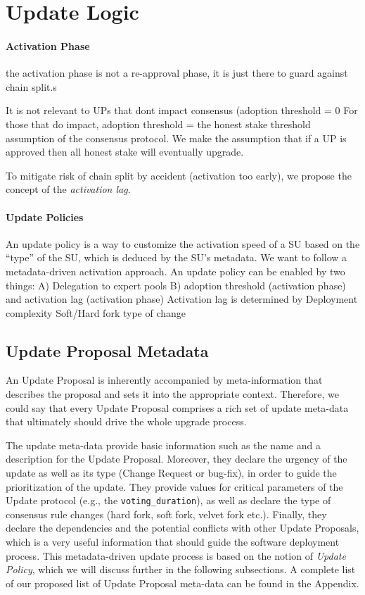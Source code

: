 \section{Update Logic}
\paragraph{Activation Phase} 
the activation phase is not a re-approval phase, it is just there to guard against chain split.s


It is not relevant to UPs that dont impact consensus (adoption threshold = 0%
For those that do impact, adoption threshold = the honest stake threshold assumption of the consensus protocol. We make the assumption that if a UP is approved then all honest stake will eventually upgrade.


To mitigate risk of chain split by accident (activation too early), we propose the concept of the \emph{activation lag}.


\paragraph{Update Policies} 
An update policy is a way to customize the activation speed of a SU based on the “type” of the SU, which is deduced by the SU’s metadata. We want to follow a metadata-driven activation approach. 
An update policy can be enabled by two things:
A) Delegation to expert pools
B) adoption threshold (activation phase) and activation lag (activation phase)
Activation lag is determined by
Deployment complexity
Soft/Hard fork type of change


\subsection*{Update Proposal Metadata} 
An Update Proposal is inherently accompanied by meta-information that describes the proposal and sets it into the appropriate context. Therefore, we could say that every Update Proposal comprises a rich set of update meta-data that ultimately should drive the whole upgrade process.

The update meta-data provide basic information such as the name and a description for the Update Proposal. Moreover, they declare the urgency of the update as well as its type (Change Request or bug-fix), in order to guide the prioritization of the update. They provide values for critical parameters of the Update protocol (e.g., the \verb;voting_duration;), as well as declare the type of consensus rule changes (hard fork, soft fork, velvet fork etc.). Finally, they declare the dependencies and the potential conflicts with other Update Proposals, which is a very useful information that should guide the software deployment process. This metadata-driven update process is  based on the notion of \emph{Update Policy}, which we will discuss further in the following subsections.
A complete list of our proposed list of Update Proposal meta-data can be found in the Appendix. 



